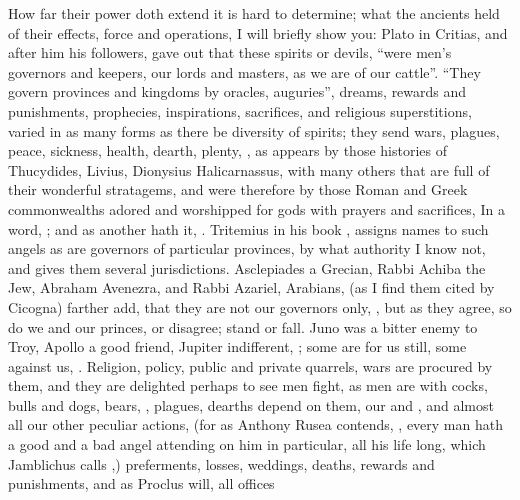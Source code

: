 How far their power doth extend it is hard to determine; what the ancients held
of their effects, force and operations, I will briefly show you: Plato in
Critias, and after him his followers, gave out that these spirits or devils,
\enquote{were men's governors and keepers, our lords and masters, as we are of our
cattle}. \enquote{They govern provinces and kingdoms by oracles,
auguries}, dreams, rewards and punishments, prophecies, inspirations,
sacrifices, and religious superstitions, varied in as many forms as there be
diversity of spirits; they send wars, plagues, peace, sickness, health, dearth,
plenty, , \etc{} as appears by those histories of Thucydides, Livius,
Dionysius Halicarnassus, with many others that are full of their wonderful
stratagems, and were therefore by those Roman and Greek commonwealths adored
and worshipped for gods with prayers and sacrifices, \etc{}
In a word, ; and as another hath it, . Tritemius in his book
, assigns names to such angels as are
governors of particular provinces, by what authority I know not, and gives them
several jurisdictions. Asclepiades a Grecian, Rabbi Achiba the Jew, Abraham
Avenezra, and Rabbi Azariel, Arabians, (as I find them cited by
Cicogna) farther add, that they are not our governors
only, , but as they agree, so do we and our princes, or disagree; stand or
fall. Juno was a bitter enemy to Troy, Apollo a good friend, Jupiter
indifferent, ; some are for us
still, some against us, . Religion,
policy, public and private quarrels, wars are procured by them, and they are
delighted perhaps to see men fight, as men are with cocks,
bulls and dogs, bears, \etc{}, plagues, dearths depend on them, our 
and , and almost all our other peculiar actions, (for as Anthony
Rusea contends, , every man hath a good
and a bad angel attending on him in particular, all his life long, which
Jamblichus calls ,) preferments, losses, weddings, deaths, rewards
and punishments, and as Proclus will, all offices
